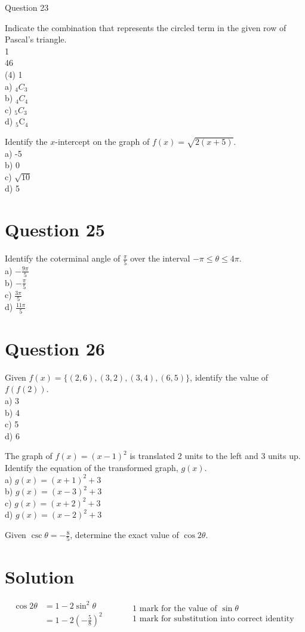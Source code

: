 \documentclass[10pt]{article}
\begin{document}
Question 23

Indicate the combination that represents the circled term in the given row of Pascal's triangle.\\
1\\
46\\
(4) 1\\
a) ${ }_{4} C_{3}$\\
b) ${ }_{4} C_{4}$\\
c) ${ }_{5} C_{3}$\\
d) ${ }_{5} \mathrm{C}_{4}$

Identify the $x$-intercept on the graph of $f(x)=\sqrt{2(x+5)}$.\\
a) -5\\
b) 0\\
c) $\sqrt{10}$\\
d) 5

\section*{Question 25}
Identify the coterminal angle of $\frac{\pi}{5}$ over the interval $-\pi \leq \theta \leq 4 \pi$.\\
a) $-\frac{9 \pi}{5}$\\
b) $-\frac{\pi}{5}$\\
c) $\frac{3 \pi}{5}$\\
d) $\frac{11 \pi}{5}$

\section*{Question 26}
Given $f(x)=\{(2,6),(3,2),(3,4),(6,5)\}$, identify the value of $f(f(2))$.\\
a) 3\\
b) 4\\
c) 5\\
d) 6

The graph of $f(x)=(x-1)^{2}$ is translated 2 units to the left and 3 units up. Identify the equation of the transformed graph, $g(x)$.\\
a) $g(x)=(x+1)^{2}+3$\\
b) $g(x)=(x-3)^{2}+3$\\
c) $g(x)=(x+2)^{2}+3$\\
d) $g(x)=(x-2)^{2}+3$

Given $\csc \theta=-\frac{8}{5}$, determine the exact value of $\cos 2 \theta$.

\section*{Solution}
$$
\begin{aligned}
\cos 2 \theta & =1-2 \sin ^{2} \theta \\
& =1-2\left(-\frac{5}{8}\right)^{2} \quad
\end{aligned} \quad \begin{aligned}
& 1 \text { mark for the value of } \sin \theta \\
& 1 \text { mark for substitution into correct identity }
\end{aligned}
$$
\end{document}

